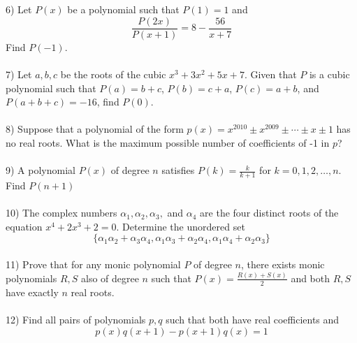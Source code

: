 \documentclass{article}
\begin{document}
\\
\\
6) Let $P(x)$ be a polynomial such that $P(1)=1$ and
\begin{equation*}
\frac{P(2x)}{P(x+1)}=8-\frac{56}{x+7}
\end{equation*}
Find $P(-1)$.
\\
\\
7) Let $a,b,c$ be the roots of the cubic $x^3+3x^2+5x+7$. Given that $P$ is a cubic polynomial such that $P(a)=b+c$, $P(b)=c+a$, $P(c)=a+b$, and $P(a+b+c)=-16$, find $P(0)$.
\\
\\
8) Suppose that a polynomial of the form $p(x)=x^{2010}\pm x^{2009} \pm \cdots \pm x \pm 1$ has no real roots. What is the maximum possible number of coefficients of -1 in $p$?
\\
\\
9) A polynomial $P(x)$ of degree $n$ satisfies $P(k)=\displaystyle\frac{k}{k+1}$ for $k=0,1,2,\ldots,n$. Find $P(n+1)$
\\
\\
10) The complex numbers $\alpha_1,\alpha_2,\alpha_3,$ and $\alpha_4$ are the four distinct roots of the equation $x^4+2x^3+2=0$. Determine the unordered set\\
\begin{equation*} \{ \alpha_1\alpha_2+\alpha_3\alpha_4,\alpha_1\alpha_3+\alpha_2\alpha_4,\alpha_1\alpha_4+\alpha_2\alpha_3 \}
\end{equation*}
\\
11) Prove that for any monic polynomial $P$ of degree $n$, there exists monic polynomials $R,S$ also of degree $n$ such that $P(x)=\frac{R(x)+S(x)}{2}$ and both $R,S$ have exactly $n$ real roots.
\\
\\
12) Find all pairs of polynomials $p,q$ such that both have real coefficients and 
\begin{equation*}
p(x)q(x+1)-p(x+1)q(x)=1
\end{equation*}
\end{document}
